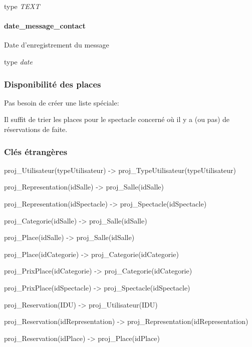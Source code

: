 type \emph{TEXT}

\paragraph{date\_message\_contact}\label{dateux5fmessageux5fcontact}

Date d'enregistrement du message

type \emph{date}

\subsubsection{Disponibilité des
places}\label{disponibilituxe9-des-places}

Pas besoin de créer une liste spéciale:

Il suffit de trier les places pour le spectacle concerné où il y a (ou
pas) de réservations de faite.

\subsubsection{Clés étrangères}\label{cluxe9s-uxe9tranguxe8res}

proj\_Utilisateur(typeUtilisateur) -\textgreater{}
proj\_TypeUtilisateur(typeUtilisateur)

proj\_Representation(idSalle) -\textgreater{} proj\_Salle(idSalle)

proj\_Representation(idSpectacle) -\textgreater{}
proj\_Spectacle(idSpectacle)

proj\_Categorie(idSalle) -\textgreater{} proj\_Salle(idSalle)

proj\_Place(idSalle) -\textgreater{} proj\_Salle(idSalle)

proj\_Place(idCategorie) -\textgreater{} proj\_Categorie(idCategorie)

proj\_PrixPlace(idCategorie) -\textgreater{}
proj\_Categorie(idCategorie)

proj\_PrixPlace(idSpectacle) -\textgreater{}
proj\_Spectacle(idSpectacle)

proj\_Reservation(IDU) -\textgreater{} proj\_Utilisateur(IDU)

proj\_Reservation(idRepresentation) -\textgreater{}
proj\_Representation(idRepresentation)

proj\_Reservation(idPlace) -\textgreater{} proj\_Place(idPlace)
